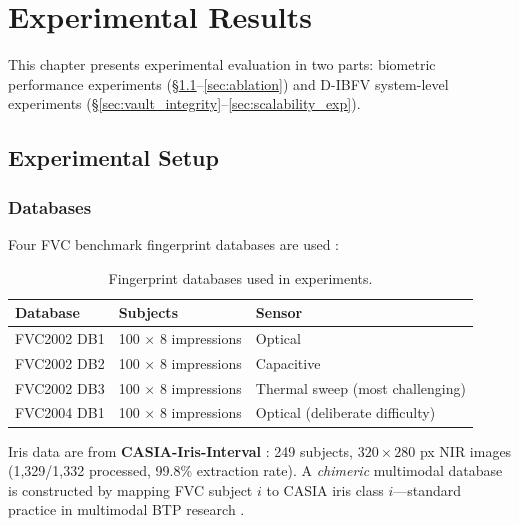 \chapter{Experimental Results}
\label{ch:results}

This chapter presents experimental evaluation in two parts: biometric performance
experiments (\S\ref{sec:exp_setup}--\ref{sec:ablation}) and D-IBFV system-level
experiments (\S\ref{sec:vault_integrity}--\ref{sec:scalability_exp}).

\section{Experimental Setup}
\label{sec:exp_setup}

\subsection{Databases}

Four FVC benchmark fingerprint databases are used \cite{maio2002fvc2002,maio2004fvc2004}:

\begin{table}[h]
\centering
\caption{Fingerprint databases used in experiments.}
\label{tab:databases}
\small
\begin{tabular}{@{}lll@{}}
\toprule
\textbf{Database} & \textbf{Subjects} & \textbf{Sensor} \\
\midrule
FVC2002 DB1 & 100 $\times$ 8 impressions & Optical \\
FVC2002 DB2 & 100 $\times$ 8 impressions & Capacitive \\
FVC2002 DB3 & 100 $\times$ 8 impressions & Thermal sweep (most challenging) \\
FVC2004 DB1 & 100 $\times$ 8 impressions & Optical (deliberate difficulty) \\
\bottomrule
\end{tabular}
\end{table}

Iris data are from \textbf{CASIA-Iris-Interval} \cite{casia_iris}: 249 subjects,
$320 \times 280$ px NIR images (1,329/1,332 processed, 99.8\% extraction rate).
A \emph{chimeric} multimodal database is constructed by mapping FVC subject $i$ to
CASIA iris class $i$---standard practice in multimodal BTP research
\cite{ross2003information,nandakumar2008multibiometric}.

